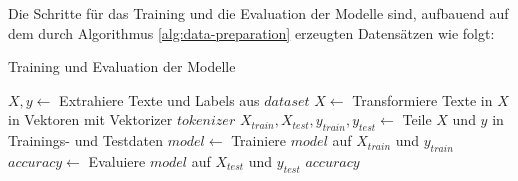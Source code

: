 Die Schritte für das Training und die Evaluation der Modelle sind, aufbauend auf dem durch Algorithmus \ref{alg:data-preparation} erzeugten Datensätzen wie folgt:
\begin{algorithm}
    \caption{Training und Evaluation der Modelle}
    \begin{algorithmic}[1]
            \State $X, y \gets$ Extrahiere Texte und Labels aus $dataset$
            \State $X \gets$ Transformiere Texte in $X$ in Vektoren mit Vektorizer $tokenizer$
            \State $X_{train}, X_{test}, y_{train}, y_{test} \gets$ Teile $X$ und $y$ in Trainings- und Testdaten
            \State $model \gets$ Trainiere $model$ auf $X_{train}$ und $y_{train}$
            \State $accuracy \gets$ Evaluiere $model$ auf $X_{test}$ und $y_{test}$
            \State \Return $accuracy$
        \EndProcedure
    \end{algorithmic}
    \label{alg:model-training}
\end{algorithm}
